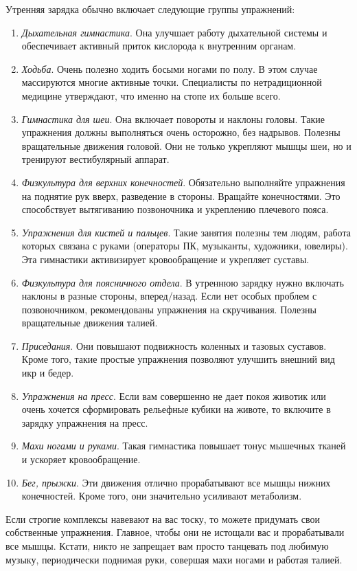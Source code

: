 Утренняя зарядка обычно включает следующие группы упражнений:
\begin{enumerate}
    \item \textit{Дыхательная гимнастика}. Она улучшает работу дыхательной системы и обеспечивает активный приток кислорода к внутренним органам.
    \item \textit{Ходьба}. Очень полезно ходить босыми ногами по полу. В этом случае массируются многие активные точки. Специалисты по нетрадиционной медицине утверждают, что именно на стопе их больше всего.
    \item \textit{Гимнастика для шеи}. Она включает повороты и наклоны головы. Такие упражнения должны выполняться очень осторожно, без надрывов. Полезны вращательные движения головой. Они не только укрепляют мышцы шеи, но и тренируют вестибулярный аппарат.
    \item \textit{Физкультура для верхних конечностей}. Обязательно выполняйте упражнения на поднятие рук вверх, разведение в стороны. Вращайте конечностями. Это способствует вытягиванию позвоночника и укреплению плечевого пояса.
    \item \textit{Упражнения для кистей и пальцев}. Такие занятия полезны тем людям, работа которых связана с руками (операторы ПК, музыканты, художники, ювелиры). Эта гимнастики активизирует кровообращение и укрепляет суставы.
    \item \textit{Физкультура для поясничного отдела}. В утреннюю зарядку нужно включать наклоны в разные стороны, вперед/назад. Если нет особых проблем с позвоночником, рекомендованы упражнения на скручивания. Полезны вращательные движения талией.
    \item \textit{Приседания}. Они повышают подвижность коленных и тазовых суставов. Кроме того, такие простые упражнения позволяют улучшить внешний вид икр и бедер.
    \item \textit{Упражнения на пресс}. Если вам совершенно не дает покоя животик или очень хочется сформировать рельефные кубики на животе, то включите в зарядку упражнения на пресс.
    \item \textit{Махи ногами и руками}. Такая гимнастика повышает тонус мышечных тканей и ускоряет кровообращение.
    \item \textit{Бег, прыжки}. Эти движения отлично прорабатывают все мышцы нижних конечностей. Кроме того, они значительно усиливают метаболизм.
\end{enumerate}
Если строгие комплексы навевают на вас тоску, то можете придумать свои собственные упражнения. Главное, чтобы они не истощали вас и прорабатывали все мышцы. Кстати, никто не запрещает вам просто танцевать под любимую музыку, периодически поднимая руки, совершая махи ногами и работая талией.


